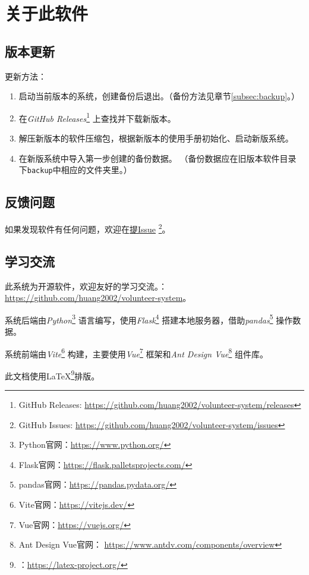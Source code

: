 \documentclass[12pt,titlepage]{article}
\newcommand{\githuburl}{https://github.com/huang2002/volunteer-system}
\newcommand{\issuesurl}{\githuburl/issues}
\newcommand{\releasesurl}{\githuburl/releases}
\newcommand{\Python}{\textit{Python}}
\newcommand{\GitHub}{\textit{GitHub}}
\begin{document}
\newpage
\section{关于此软件}

\subsection{版本更新}

更新方法：

\begin{enumerate}
    \item 启动当前版本的系统，创建备份后退出。（备份方法见章节\ref{subsec:backup}。）
    \item 在\textit{GitHub Releases}\footnote{GitHub Releases: \url{\releasesurl}}
          上查找并下载新版本。
    \item 解压新版本的软件压缩包，根据新版本的使用手册初始化、启动新版系统。
    \item 在新版系统中导入第一步创建的备份数据。
          （备份数据应在旧版本软件目录下\texttt{backup}中相应的文件夹里。）
\end{enumerate}

\subsection{反馈问题}
\label{subsec:report}

如果发现软件有任何问题，欢迎在\href{\issuesurl}{提Issue}
\footnote{GitHub Issues: \url{\issuesurl}}。

\subsection{学习交流}

此系统为开源软件，欢迎友好的学习交流。：\url{\githuburl}。

系统后端由\Python\footnote{Python官网：\url{https://www.python.org/}}
语言编写，使用\textit{Flask}\footnote{Flask官网：\url{https://flask.palletsprojects.com/}}
搭建本地服务器，借助\textit{pandas}\footnote{pandas官网：\url{https://pandas.pydata.org/}}
操作数据。

系统前端由\textit{Vite}\footnote{Vite官网：\url{https://vitejs.dev/}}
构建，主要使用\textit{Vue}\footnote{Vue官网：\url{https://vuejs.org/}}
框架和\textit{Ant Design Vue}\footnote{Ant Design Vue官网：%
    \url{https://www.antdv.com/components/overview}}
组件库。

此文档使用\LaTeX\footnote{：\url{https://latex-project.org/}}排版。
\end{document}
